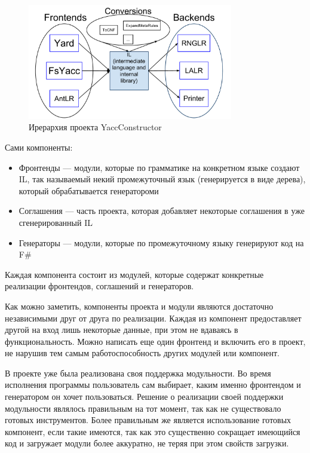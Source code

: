 \documentclass{matmex-diploma}
\begin{document}
\begin{figure}[h!]
\begin{center}
\includegraphics[width=0.8\textwidth]{structyc}
\caption{Ирерархия проекта YaccConstructor}
\label{fig:structyc} 
\end{center}
\end{figure}

Сами компоненты\cite{YC_article}:
\begin{itemize}
\item Фронтенды — модули, которые по грамматике на конкретном языке создают IL, так называемый некий промежуточный язык (генерируется в виде дерева), который обрабатывается генератороми
\item Соглашения  — часть проекта, которая добавляет некоторые соглашения в уже сгенерированный IL
\item Генераторы — модули, которые по промежуточному языку генерируют код на F\#
\end{itemize}

Каждая компонента состоит из модулей, которые содержат конкретные реализации фронтендов, соглашений и генераторов.

Как можно заметить, компоненты проекта и модули являются достаточно независимыми друг от друга по реализации. Каждая из компонент предоставляет другой на вход лишь некоторые данные, при этом не вдаваясь в функциональность. Можно написать еще один фронтенд и  включить его в проект, не нарушив тем самым работоспособность других модулей или компонент.

В проекте уже была реализована своя поддержка модульности. Во время исполнения программы пользователь сам выбирает, каким именно фронтендом и генератором он хочет пользоваться. Решение о реализации своей поддержки модульности являлось правильным на тот момент, так как не существовало готовых инструментов. Более правильным же является использование готовых компонент, если такие имеются, так как это существенно сокращает имеющийся код и загружает модули более аккуратно, не теряя при этом свойств загрузки.
\end{document}
